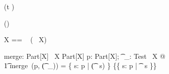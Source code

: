 \begin{zed}
   \relation (t \varg)
\end{zed}

\begin{zed}
   \generic (\Test \varg)
\end{zed}

\begin{zed}
 \Test X == \power~  (\power~  X)
\end{zed}

\begin{gendef}[X]
  merge: Part[X] \cross  \Test~X \fun  Part[X]
\where
   \forall  p: Part[X]; \t~\_: Test~ X @ \\
 	\t1 merge~(p, (\t~\_)) = \{  s: p | \lnot  (\t~ s) \} \cup  \{\bigcup  \{  s: p | \t~ s \}\}
\end{gendef}